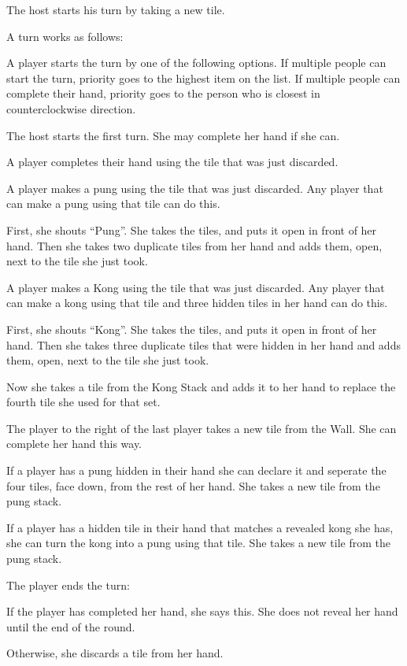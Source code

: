 \documentclass{article}
\begin{document}
The host starts his turn by taking a new tile.

A turn works as follows:
\begin{enumerate*}
    \item A player starts the turn by one of the following options. If multiple people can start the turn, priority goes to the highest item on the list. If multiple people can complete their hand, priority goes to the person who is closest in counterclockwise direction.
    \begin{enumerate*}
        \item The host starts the first turn. She may complete her hand if she can.
        \item A player completes their hand using the tile that was just discarded.
        \item A player makes a pung using the tile that was just discarded. Any player that can make a pung using that tile can do this.

        First, she shouts ``Pung''. She takes the tiles, and puts it open in front of her hand. Then she takes two duplicate tiles from her hand and adds them, open, next to the tile she just took.
        \item A player makes a Kong using the tile that was just discarded. Any player that can make a kong using that tile and three hidden tiles in her hand can do this.

        First, she shouts ``Kong''. She takes the tiles, and puts it open in front of her hand. Then she takes three duplicate tiles that were hidden in her hand and adds them, open, next to the tile she just took.

        Now she takes a tile from the Kong Stack and adds it to her hand to replace the fourth tile she used for that set.
        \item The player to the right of the last player takes a new tile from the Wall. She can complete her hand this way.
    \end{enumerate*}
    \item If a player has a pung hidden in their hand she can declare it and seperate the four tiles, face down, from the rest of her hand. She takes a new tile from the pung stack.
    \item If a player has a hidden tile in their hand that matches a revealed kong she has, she can turn the kong into a pung using that tile. She takes a new tile from the pung stack.
    \item The player ends the turn:
        \begin{enumerate*}
            \item If the player has completed her hand, she says this. She does not reveal her hand until the end of the round.
            \item Otherwise, she discards a tile from her hand.
        \end{enumerate*}
\end{enumerate*}
\end{document}

